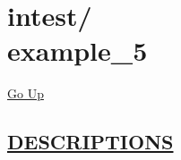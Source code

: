 \chapter*{\color{headfile}
{\large intest\slash\hspace{0pt}}
 \\
example_5
}
\hypertarget{ecldoc:toc:intest.example_5}{}
\hyperlink{ecldoc:toc:root/intest}{Go Up}


\section*{\underline{\textsf{DESCRIPTIONS}}}
